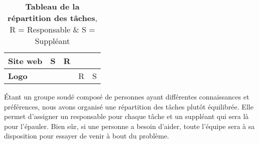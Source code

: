 \documentclass[12pt]{article}
\begin{document}
\begin{table}[ht]
\begin{tabular}{|l||*{4}{c|}}
                        \hline
                        \textbf{Site web} & \cellcolor{cyan!60} S & \cellcolor{red!50} R & & 
                        \\
                        
                        \hline
                        \textbf{Logo} & & & \cellcolor{red!50} R & \cellcolor{cyan!60} S
                       
                        \\
                        \hline
                    \end{tabular}
                    \caption{\textbf{Tableau de la répartition des tâches}, R = Responsable \& S = Suppléant}
                \end{table}
                
                \par Étant un groupe soudé composé de personnes ayant différentes connaissances et préférences, nous avons organisé une répartition des tâches plutôt équilibrée. Elle permet d'assigner un responsable pour chaque tâche et un suppléant qui sera là pour l'épauler. Bien sûr, si une personne a besoin d'aider, toute l'équipe sera à sa disposition pour essayer de venir à bout du problème.
                
                \clearpage
\end{document}
